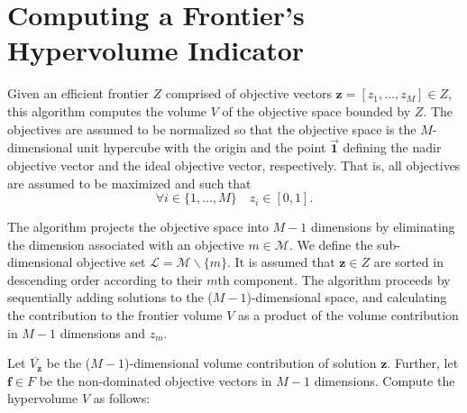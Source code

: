  
\chapter{Computing a Frontier's Hypervolume Indicator}
\label{chap:appAHypervolumeAlgo}
Given an efficient frontier $Z$ comprised of objective vectors $\mathbf{z} = [z_1,\ldots,z_M] \in Z$, this algorithm computes the volume $V$ of the objective space bounded by $Z$. The objectives are assumed to be normalized so that the objective space is the $M$-dimensional unit hypercube with the origin and the point $\vec{\mathbf{1}}$ defining the nadir objective vector and the ideal objective vector, respectively. That is, all objectives are assumed to be maximized and such that
$$ \forall i \in \{1,\ldots,M\} \quad z_i \in [0,1].$$

The algorithm projects the objective space into $M-1$ dimensions by eliminating the dimension associated with an objective $m \in \mathcal{M}$. We define the sub-dimensional objective set $\mathcal{L} = \mathcal{M} \backslash \{m\}$. It is assumed that $\mathbf{z} \in Z$ are sorted in descending order according to their $m$th component. The algorithm proceeds by sequentially adding solutions to the ($M-1$)-dimensional space, and calculating the contribution to the frontier volume $V$ as a product of the volume contribution in $M-1$ dimensions and $z_m$.

Let $\overbar{V_\mathbf{z}}$ be the ($M-1$)-dimensional volume contribution of solution $\mathbf{z}$. Further, let
$\mathbf{f} \in F$ be the non-dominated objective vectors in $M-1$ dimensions.
Compute the hypervolume $V$ as follows:

